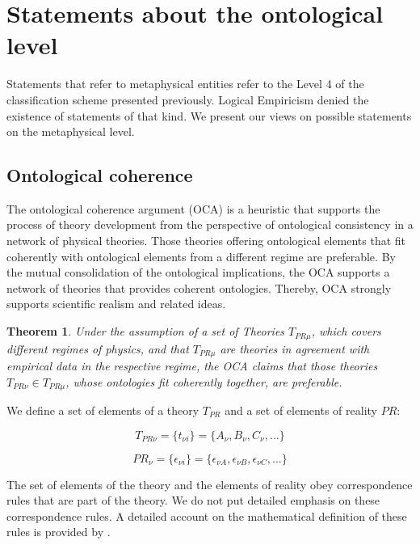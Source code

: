 \documentclass{article}
\newtheorem{theorem}{Theorem} %
\begin{document}
\section{Statements about the ontological level}

Statements that refer to metaphysical entities refer to the Level 4 of the classification scheme presented previously. Logical Empiricism denied the existence of statements of that kind. We present our views on possible statements on the metaphysical level.

\subsection{Ontological coherence}

The ontological coherence argument (OCA) is a heuristic that supports the process of theory development from the perspective of ontological consistency in a network of physical theories. Those theories offering ontological elements that fit coherently with ontological elements from a different regime are preferable. By the mutual consolidation of the ontological implications, the OCA supports a network of theories that provides coherent ontologies. Thereby, OCA strongly supports scientific realism and related ideas.

\begin{theorem}
Under the assumption of a set of Theories $T_{PR \mu}$, which covers different regimes of physics, and that $T_{PR \mu}$ are theories in agreement with empirical data in the respective regime, the OCA claims that those theories $ T_{PR\nu}\in T_{PR \mu}$, whose ontologies fit coherently together, are preferable. 
\end{theorem}

We define a set of elements of a theory $ T_{PR} $ and a set of elements of reality $ PR $:

\begin{equation}
T_{PR\nu} = \{ t_{\nu i} \} = \{ A_\nu,B_\nu,C_\nu,... \}
\label{Definition Elements of theory}
\end{equation}

\begin{equation}
PR_\nu = \{\epsilon_{\nu i}\} = \{ \epsilon_{\nu A},\epsilon_{\nu B}, \epsilon_{\nu C},... \} 
\end{equation}

The set of elements of the theory and the elements of reality obey correspondence rules that are part of the theory. We do not put detailed emphasis on these correspondence rules. A detailed account on the mathematical definition of these rules is provided by \cite[]{ludwig2007new}. \newline
\end{document}
